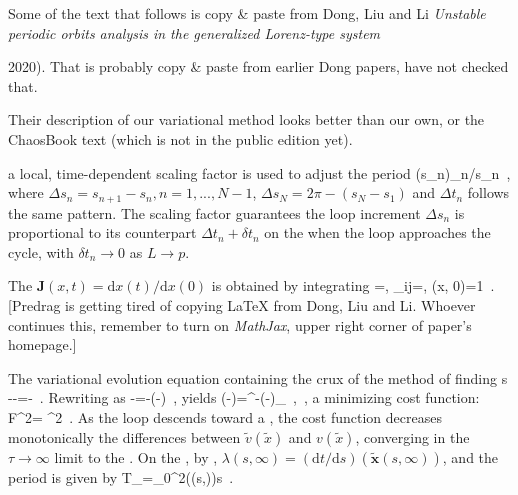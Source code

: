 {Some of the text that follows is copy \& paste from Dong, Liu and
Li {\em Unstable periodic orbits analysis in the generalized
{Lorenz}-type system} {2020). That is probably copy \& paste from
earlier Dong papers, have not checked that.

Their description of our variational
method looks better than our own, or the
ChaosBook text (which is not in the public edition yet).

                                                    \toCB
[...] a local, time-dependent scaling factor is used to adjust the period
\beq
\lambda \left({s}_{n}\right)_{n}/{\Delta}{s}_{n}
\,,
where
${\Delta}{s}_n = {s}_{n+1} - {s}_n, n = 1, ..., N - 1$,
${\Delta}{s}_{N}=2{\pi}-\left({s}_{N}-{s}_{1}\right)$
 and
 ${\Delta}{t}_{n}$
follows the same pattern. The scaling factor guarantees the loop
increment
${\Delta}{s}_{n}$ is proportional to its counterpart
$\Delta t_n + \delta t_n$
on the {\po} when the loop approaches the cycle, with
$\delta t_n \to 0$ as $L \to p$.

The {\jacobianM}
\(
\boldsymbol{J}\left(x,t\right)=\mathrm{d}x\left(t\right)/\mathrm{d}x\left(0\right)
\)
is obtained by integrating
\beq
{}=, {}_{ij}=, \quad {}\quad {}\left(x, 0\right)=1
\,.
[Predrag is getting tired of copying LaTeX from
Dong, Liu and Li. Whoever continues this,
remember to turn on \emph{MathJax}, upper right corner of paper's homepage.]

The variational evolution equation containing the crux of the method of
finding {\po}s
\beq
{}-\lambda {}-\frac{\partial \lambda }{\partial \tau }=\lambda {}-
\,.
Rewriting as
\beq
{}-\lambda {}=-\left(-\lambda {}\right)
\,,
yields
\beq
\left(-\lambda {}\right)={}^{-\tau }\left(-\lambda {}\right){\vert }_{}
\,,
\,,
a minimizing cost function:
\beq
{F}^{2}= ^{2}
\,.
As the loop descends toward a \po, the cost function
decreases monotonically the differences between
$\tilde{v}\left(\tilde{x}\right)$ and ${v}\left(\tilde{x}\right)$,
converging in the $\tau\to\infty$ limit to the \po. On the \po, by
,
\(
\lambda \left(s,\infty \right)=\left(\mathrm{d}t/\mathrm{d}s\right)\left(\tilde{\boldsymbol{x}}\left(s,\infty \right)\right)
\),
and the
period is given by
\beq
{T}_{}={\int }_{0}^{2\pi }\lambda \left(\left(s,\infty \right)\right)s
\,.

}}

